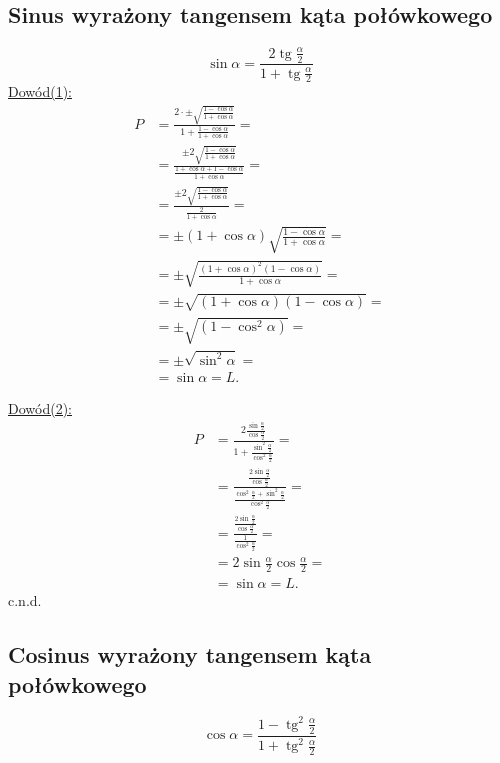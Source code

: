 \documentclass[12pt,a4paper,fleqn]{article}
\DeclareMathOperator{\tg}{tg}
\begin{document}
	\subsection{Sinus wyrażony tangensem kąta połówkowego}
		\begin{equation*}
		\sin\alpha = \frac{2\tg\frac{\alpha}{2}}{1+\tg\frac{\alpha}{2}}
		\end{equation*}
		\underline{Dowód(1):} \noindent
		\begin{align*}
			P &= \frac{2\cdot\pm\sqrt{\frac{1-\cos\alpha}{1+\cos\alpha}}}{1+\frac{1-\cos\alpha}{1+\cos\alpha}} =\\
			  &=\frac{\pm2\sqrt{\frac{1-\cos\alpha}{1+\cos\alpha}}}{\frac{1+\cos\alpha+1-\cos\alpha}{1+\cos\alpha}} =\\
			  &= \frac{\pm2\sqrt{\frac{1-\cos\alpha}{1+\cos\alpha}}}{\frac{2}{1+\cos\alpha}} =\\
			  &=\pm(1+\cos\alpha)\sqrt{\frac{1-\cos\alpha}{1+\cos\alpha}} =\\
			  &= \pm \sqrt{\frac{(1+\cos\alpha)^2(1-\cos\alpha)}{1+\cos\alpha}} =\\
			  &= \pm \sqrt{(1+\cos\alpha)(1-\cos\alpha)} =\\
			  &= \pm \sqrt{(1-\cos^2\alpha)} =\\
			  &= \pm \sqrt{\sin^2\alpha} = \\
			  &= \sin\alpha = L.
		\end{align*}
		
		\underline{Dowód(2):} \noindent
		\begin{align*}
			 P &= \frac{2\frac{\sin\frac{\alpha}{2}}{\cos\frac{\alpha}{2}}}{1+\frac{\sin^2\frac{\alpha}{2}}{\cos^2\frac{\alpha}{2}}} =\\
			   &=\frac{\frac{2\sin\frac{\alpha}{2}}{\cos\frac{\alpha}{2}}}{\frac{\cos^2\frac{\alpha}{2}+\sin^2\frac{\alpha}{2}}{\cos^2\frac{\alpha}{2}}} =\\
			   &= \frac{\frac{2\sin\frac{\alpha}{2}}{\cos\frac{\alpha}{2}}}{\frac{1}{\cos^2\frac{\alpha}{2}}} =\\
			   &= 2\sin\frac{\alpha}{2}\cos\frac{\alpha}{2} = \\
			   &= \sin\alpha = L.
		\end{align*}
		c.n.d.

	\subsection{Cosinus wyrażony tangensem kąta połówkowego}
		\begin{equation*}
			\cos\alpha = \frac{1-\tg^2\frac{\alpha}{2}}{1+\tg^2\frac{\alpha}{2}}
		\end{equation*}
		
\end{document}
